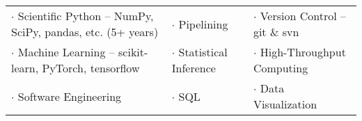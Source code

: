 
\vspace{-0.3cm}

\begin{cventries}

\setlength\tabcolsep{6pt}
\begin{tabular}{lll}
$\cdot$ \footnotesize{Scientific Python -- NumPy, SciPy, pandas, etc. (5+ years)} & $\cdot$ \footnotesize{Pipelining} & $\cdot$ \footnotesize{Version Control -- git \& svn} \\
$\cdot$ \footnotesize{Machine Learning -- scikit-learn, PyTorch, tensorflow} & $\cdot$ \footnotesize{Statistical Inference} & $\cdot$ \footnotesize{High-Throughput Computing} \\
$\cdot$ \footnotesize{Software Engineering} & $\cdot$ \footnotesize{SQL} & $\cdot$ \footnotesize{Data Visualization}
\end{tabular}

\end{cventries}